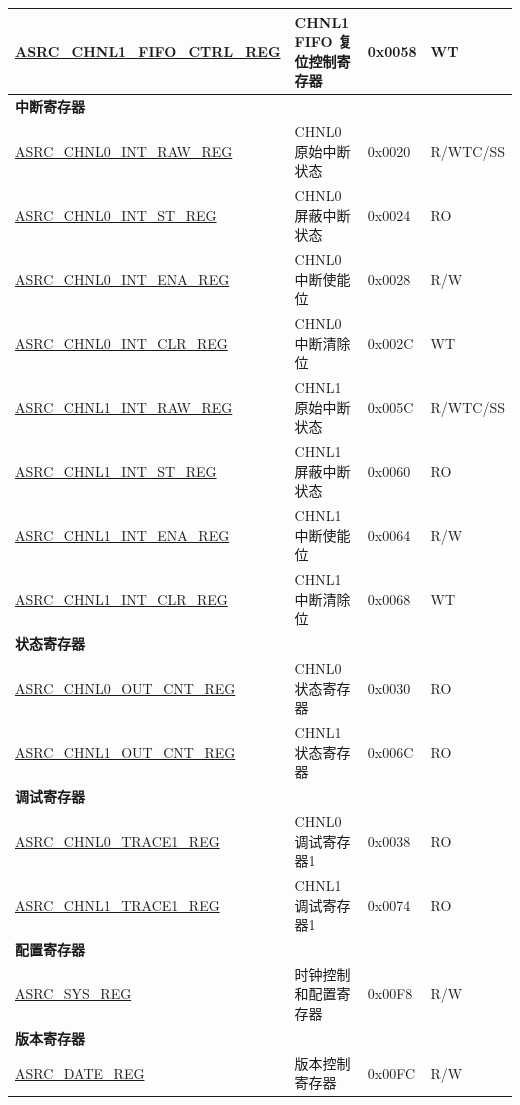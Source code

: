 \begin{longtable}{ | p{6cm} | p{6.5cm} | p{1.3cm} | p{1.7cm} | }
\hyperref[regdesc:ASRCCHNL1FIFOCTRLREG]{ASRC\_CHNL1\_FIFO\_CTRL\_REG} & CHNL1 FIFO 复位控制寄存器 & 0x0058 & WT \\ \hline
\multicolumn{4}{|l|}{\textbf{中断寄存器}} \\ \hline
\hyperref[regdesc:ASRCCHNL0INTRAWREG]{ASRC\_CHNL0\_INT\_RAW\_REG} & CHNL0 原始中断状态 & 0x0020 & R/WTC/SS \\ \hline
\hyperref[regdesc:ASRCCHNL0INTSTREG]{ASRC\_CHNL0\_INT\_ST\_REG} & CHNL0 屏蔽中断状态 & 0x0024 & RO \\ \hline
\hyperref[regdesc:ASRCCHNL0INTENAREG]{ASRC\_CHNL0\_INT\_ENA\_REG} & CHNL0 中断使能位 & 0x0028 & R/W \\ \hline
\hyperref[regdesc:ASRCCHNL0INTCLRREG]{ASRC\_CHNL0\_INT\_CLR\_REG} & CHNL0 中断清除位 & 0x002C & WT \\ \hline
\hyperref[regdesc:ASRCCHNL1INTRAWREG]{ASRC\_CHNL1\_INT\_RAW\_REG} & CHNL1 原始中断状态 & 0x005C & R/WTC/SS \\ \hline
\hyperref[regdesc:ASRCCHNL1INTSTREG]{ASRC\_CHNL1\_INT\_ST\_REG} & CHNL1 屏蔽中断状态 & 0x0060 & RO \\ \hline
\hyperref[regdesc:ASRCCHNL1INTENAREG]{ASRC\_CHNL1\_INT\_ENA\_REG} & CHNL1 中断使能位 & 0x0064 & R/W \\ \hline
\hyperref[regdesc:ASRCCHNL1INTCLRREG]{ASRC\_CHNL1\_INT\_CLR\_REG} & CHNL1 中断清除位 & 0x0068 & WT \\ \hline
\multicolumn{4}{|l|}{\textbf{状态寄存器}} \\ \hline
\hyperref[regdesc:ASRCCHNL0OUTCNTREG]{ASRC\_CHNL0\_OUT\_CNT\_REG} & CHNL0 状态寄存器 & 0x0030 & RO \\ \hline
\hyperref[regdesc:ASRCCHNL1OUTCNTREG]{ASRC\_CHNL1\_OUT\_CNT\_REG} & CHNL1 状态寄存器 & 0x006C & RO \\ \hline
\multicolumn{4}{|l|}{\textbf{调试寄存器}} \\ \hline
\hyperref[regdesc:ASRCCHNL0TRACE1REG]{ASRC\_CHNL0\_TRACE1\_REG} & CHNL0 调试寄存器1 & 0x0038 & RO \\ \hline
\hyperref[regdesc:ASRCCHNL1TRACE1REG]{ASRC\_CHNL1\_TRACE1\_REG} & CHNL1 调试寄存器1 & 0x0074 & RO \\ \hline
\multicolumn{4}{|l|}{\textbf{配置寄存器}} \\ \hline
\hyperref[regdesc:ASRCSYSREG]{ASRC\_SYS\_REG} & 时钟控制和配置寄存器 & 0x00F8 & R/W \\ \hline
\multicolumn{4}{|l|}{\textbf{版本寄存器}} \\ \hline
\hyperref[regdesc:ASRCDATEREG]{ASRC\_DATE\_REG} & 版本控制寄存器 & 0x00FC & R/W \\ \hline
\end{longtable}
